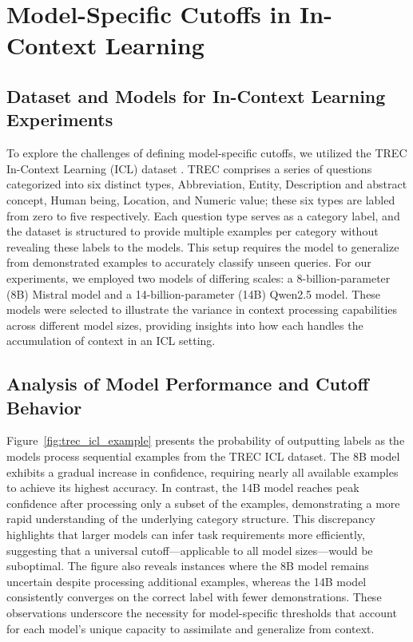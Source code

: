 \section{Model-Specific Cutoffs in In-Context Learning}
\label{app:model_cutoff}

\subsection{Dataset and Models for In-Context Learning Experiments}
To explore the challenges of defining model-specific cutoffs, we utilized the TREC In-Context Learning (ICL) dataset \cite{hovy-etal-2001-toward}. TREC comprises a series of questions categorized into six distinct types, Abbreviation, Entity, Description and abstract concept, Human being, Location, and Numeric value; these six types are labled from zero to five respectively. Each question type serves as a category label, and the dataset is structured to provide multiple examples per category without revealing these labels to the models. This setup requires the model to generalize from demonstrated examples to accurately classify unseen queries. For our experiments, we employed two models of differing scales: a 8-billion-parameter (8B) Mistral model and a 14-billion-parameter (14B) Qwen2.5 model. These models were selected to illustrate the variance in context processing capabilities across different model sizes, providing insights into how each handles the accumulation of context in an ICL setting.

\subsection{Analysis of Model Performance and Cutoff Behavior}
Figure~\ref{fig:trec_icl_example} presents the probability of outputting labels as the models process sequential examples from the TREC ICL dataset. The 8B model exhibits a gradual increase in confidence, requiring nearly all available examples to achieve its highest accuracy. In contrast, the 14B model reaches peak confidence after processing only a subset of the examples, demonstrating a more rapid understanding of the underlying category structure. This discrepancy highlights that larger models can infer task requirements more efficiently, suggesting that a universal cutoff—applicable to all model sizes—would be suboptimal. The figure also reveals instances where the 8B model remains uncertain despite processing additional examples, whereas the 14B model consistently converges on the correct label with fewer demonstrations. These observations underscore the necessity for model-specific thresholds that account for each model's unique capacity to assimilate and generalize from context.

